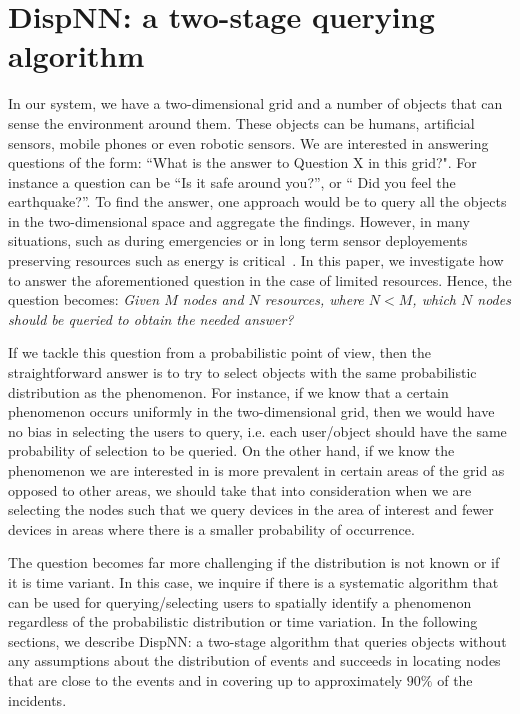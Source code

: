 \documentclass{acm_proc_article-sp}
\begin{document}
\section{DispNN: a two-stage querying algorithm}
In our system, we have a two-dimensional grid and a number of objects that can sense the environment around them. These objects can be humans, artificial sensors, mobile phones or even robotic sensors. We are interested in answering questions of the form: ``What is the answer to Question X in this grid?". For instance a question can be ``Is it safe around you?'', or `` Did you feel the earthquake?''. To find the answer, one approach would be to query all the objects in the two-dimensional space and aggregate the findings. However, in many situations, such as during emergencies or in long term sensor deployements preserving resources such as energy is critical~\cite{manoj2007communication}. In this paper, we investigate how to answer the aforementioned question in the case of limited resources. Hence, the question becomes: \textit{Given $M$ nodes and $N$ resources, where $N < M$, which $N$ nodes should be queried to obtain the needed answer?}\par


If we tackle this question from a probabilistic point of view, then the straightforward answer is to try to select objects with the same probabilistic distribution as the phenomenon. For instance, if we know that a certain phenomenon occurs uniformly in the two-dimensional grid, then we would have no bias in selecting the users to query, i.e. each user/object should have the same probability of selection to be queried. On the other hand, if we know the phenomenon we are interested in is more prevalent in certain areas of the grid as opposed to other areas, we should take that into consideration when we are selecting the nodes such that we query devices in the area of interest and fewer devices in areas where there is a smaller probability of occurrence.\par

The question becomes far more challenging if the distribution is not known or if it is time variant. In this case, we inquire if there is a systematic algorithm that can be used for querying/selecting users to spatially identify a phenomenon regardless of the probabilistic distribution or time variation. In the following sections, we describe DispNN: a two-stage algorithm that queries objects without any assumptions about the distribution of events and succeeds in locating nodes that are close to the events and in covering up to approximately $90\%$ of the incidents. \par
\end{document}
